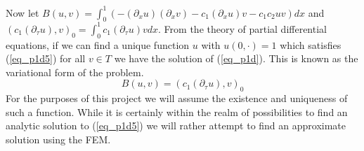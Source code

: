\documentclass[11pt,fleqn]{article}
\theoremstyle{defstyle}
\begin{document}
Now let $B(u, v) = \int_0^1 (-(\partial_xu)(\partial_xv) - c_1(\partial_xu)v - c_1c_2uv)dx$ and $(c_1(\partial_{\tau}u),v)_0 = \int^1_0 c_1(\partial_{\tau}u)v dx$. From the theory of partial differential equations, if we can find a unique function $u$ with $u(0, \cdot)=1$ which satisfies (\ref{eq_p1d5}) for all $v \in T$ we have the solution of (\ref{eq_p1d}). This is known as the variational form of the problem. 
\begin{equation}
B(u, v) = (c_1(\partial_{\tau}u),v)_0
\label{eq_p1d5}
\end{equation}
For the purposes of this project we will assume the existence and uniqueness of such a function. While it is certainly within the realm of possibilities to find an analytic solution to (\ref{eq_p1d5}) we will rather attempt to find an approximate solution using the FEM.
\end{document}
